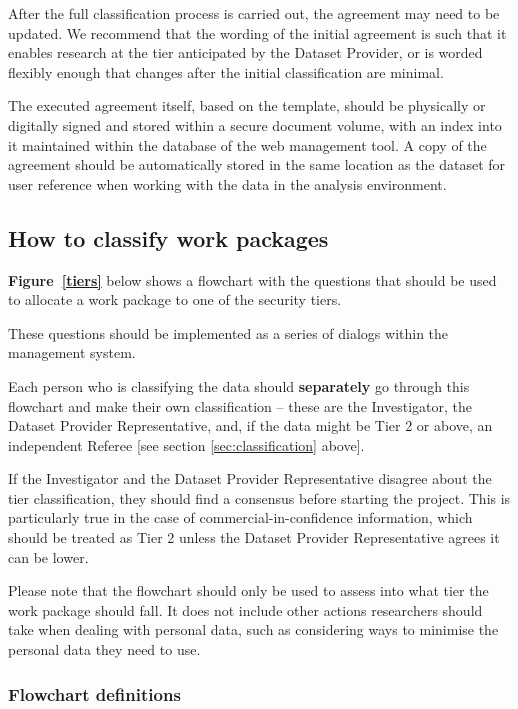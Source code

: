 \documentclass[10pt,a4paper,twocolumn]{article}
\begin{document}
After the full classification process is carried out, the agreement may need to be updated. We recommend that the wording of the initial agreement is such that it enables research at the tier anticipated by the Dataset Provider, or is worded flexibly enough that changes after the initial classification are minimal.

The executed agreement itself, based on the template, should be physically or digitally signed and stored within a secure document volume, with an index into it maintained within the database of the web management tool. A copy of the agreement should be automatically stored in the same location as the dataset for user reference when working with the data in the analysis environment.

\subsection{How to classify work packages}
\textbf{Figure~\ref{tiers}} below shows a flowchart with the questions that should be used to allocate a work package to one of the security tiers.

These questions should be implemented as a series of dialogs within the management system.

Each person who is classifying the data should \textbf{separately} go through this flowchart and make their own classification – these are the Investigator, the Dataset Provider Representative, and, if the data might be Tier 2 or above, an independent Referee [see section \ref{sec:classification} above]. 

If the Investigator and the Dataset Provider Representative disagree about the tier classification, they should find a consensus before starting the project. This is particularly true in the case of commercial-in-confidence information, which should be treated as Tier 2 unless the Dataset Provider Representative agrees it can be lower.

Please note that the flowchart should only be used to assess into what tier the work package should fall. It does not include other actions researchers should take when dealing with personal data, such as considering ways to minimise the personal data they need to use.

\subsubsection{Flowchart definitions}
\label{sec:definitions}
\end{document}
